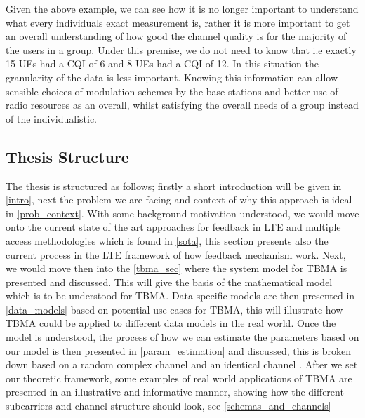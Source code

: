 \documentclass{article}
\begin{document}

Given the above example, we can see how it is no longer important to understand what every individuals exact measurement is, rather it is more important to get an overall understanding of how good the channel quality is for the majority of the users in a group. Under this premise, we do not need to know that i.e exactly 15 UEs had a CQI of 6 and 8 UEs had a CQI of 12. In this situation the granularity of the data is less important. Knowing this information can allow sensible choices of modulation schemes by the base stations and better use of radio resources as an overall, whilst satisfying the overall needs of a group instead of the individualistic. 


\subsection{Thesis Structure }
The thesis is structured as follows; firstly a short introduction will be given in \cref{intro}, next the problem we are facing and context of why this approach is ideal in \cref{prob_context}. With some background motivation understood, we would move onto the current state of the art approaches for feedback in LTE and multiple access methodologies which is found in \cref{sota}, this section presents also the current process in the LTE framework of how feedback mechanism work. Next, we would move then into the \cref{tbma_sec} where the system model for TBMA is presented and discussed. This will give the basis of the mathematical model which is to be understood for TBMA. Data specific models are then presented in \cref{data_models} based on potential use-cases for TBMA, this will illustrate how TBMA could be applied to different data models in the real world. Once the model is understood, the process of how we can estimate the parameters based on our model is then presented in \cref{param_estimation} and discussed, this is broken down based on a random complex channel and an identical channel \cite{tbma}. After we set our theoretic framework, some examples of real world applications of TBMA are presented in an illustrative and informative manner, showing how the different subcarriers and channel structure should look, see \cref{schemas_and_channels}
\end{document}
